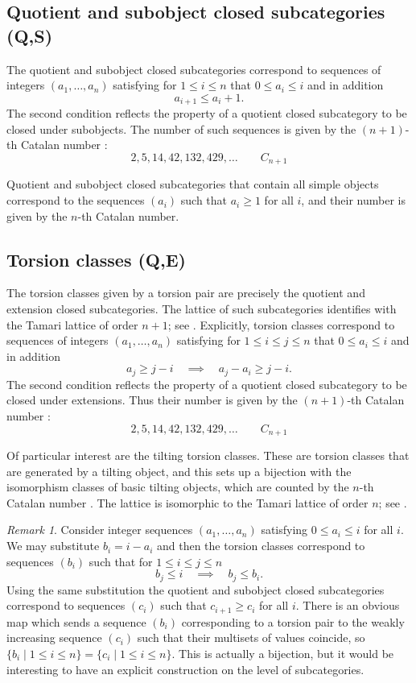 \documentclass[a4paper]{amsart}
\theoremstyle{plain}
\theoremstyle{definition}
\theoremstyle{remark}
\newtheorem{rem}[thm]{Remark}
\numberwithin{equation}{section}
\begin{document}
\subsection*{Quotient and subobject closed subcategories (Q,S)}

The quotient and subobject closed subcategories correspond to
sequences of integers $(a_1,\ldots,a_n)$ satisfying for $1\le i\le n$
that $0\le a_i\le i$ and in addition
\[a_{i+1}\le a_i +1.\] The second condition reflects the
property of a quotient closed subcategory to be closed under
subobjects. The number of such sequences is given by the $(n+1)$-th
Catalan number \cite[Exercise~80]{St2015}:
\[2, 5, 14, 42, 132, 429,\ldots \qquad C_{n+1}\tag*{$\#(Q,S)$}\]

Quotient and subobject closed subcategories that contain all simple
objects correspond to the sequences $(a_i)$ such that $a_i\ge 1$ for all
$i$, and their  number is given by the $n$-th
Catalan number.

\subsection*{Torsion classes (Q,E)}

The torsion classes given by a torsion pair are precisely the quotient
and extension closed subcategories. The lattice of such subcategories
identifies with the Tamari lattice of order $n+1$; see
\cite{Th2012}. Explicitly, torsion classes
correspond to sequences of integers $(a_1,\ldots,a_n)$ satisfying for
$1\le i\le j\le n$ that $0\le a_i\le i$
and in addition
\[a_j\ge j-i\quad\implies \quad a_j-a_i\ge j-i.\] The second condition
reflects the property of a quotient closed subcategory to be closed
under extensions. Thus their number is given by the $(n+1)$-th Catalan
number \cite[Problem~A41]{St2015}:
\[2, 5, 14, 42, 132, 429,\ldots \qquad C_{n+1}\tag*{$\#(Q,E)$}\]

Of particular interest are the tilting torsion classes. These are
torsion classes that are generated by a tilting object, and this sets
up a bijection with the isomorphism classes of basic tilting objects, which are counted by
the $n$-th Catalan number \cite{Ga1981}. The lattice is isomorphic to the Tamari
lattice of order $n$; see \cite{BK2004}.

\begin{rem}
  Consider integer sequences $(a_1,\ldots,a_n)$ satisfying
  $0\le a_i\le i$ for all $i$. We may substitute $b_i=i-a_i$ and then
  the torsion classes correspond to sequences $(b_i)$ such that for
  $1\le i\le j\le n$
  \[ b_j\le i\quad\implies \quad b_j\le b_i.\] Using the same
  substitution the quotient and subobject closed subcategories
  correspond to sequences $(c_i)$ such that $c_{i+1}\ge c_i$ for all
  $i$. There is an obvious map which sends a sequence $(b_i)$
  corresponding to a torsion pair to the weakly increasing sequence
  $(c_i)$ such that their multisets of values coincide, so
  $\{b_i\mid 1\le i\le n\}=\{c_i\mid 1\le i\le n\}$. This is actually
  a bijection, but it would be interesting to have an explicit
  construction on the level of subcategories.
\end{rem}  
\end{document}
